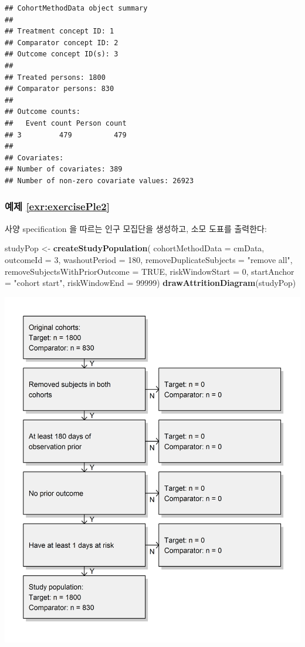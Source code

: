 \documentclass[11pt]{book}
\newenvironment{Shaded}{\begin{snugshade}}{\end{snugshade}}
\newcommand{\KeywordTok}[1]{\textcolor[rgb]{0.13,0.29,0.53}{\textbf{#1}}}
\newcommand{\DataTypeTok}[1]{\textcolor[rgb]{0.13,0.29,0.53}{#1}}
\newcommand{\DecValTok}[1]{\textcolor[rgb]{0.00,0.00,0.81}{#1}}
\newcommand{\StringTok}[1]{\textcolor[rgb]{0.31,0.60,0.02}{#1}}
\newcommand{\OtherTok}[1]{\textcolor[rgb]{0.56,0.35,0.01}{#1}}
\newcommand{\NormalTok}[1]{#1}
\theoremstyle{definition}
\theoremstyle{definition}
\theoremstyle{definition}
\theoremstyle{remark}
\begin{document}
\begin{verbatim}
## CohortMethodData object summary
## 
## Treatment concept ID: 1
## Comparator concept ID: 2
## Outcome concept ID(s): 3
## 
## Treated persons: 1800
## Comparator persons: 830
## 
## Outcome counts:
##   Event count Person count
## 3         479          479
## 
## Covariates:
## Number of covariates: 389
## Number of non-zero covariate values: 26923
\end{verbatim}

\subsubsection*{예제 \ref{exr:exercisePle2}}\label{-refexrexerciseple2}

사양 specification 을 따르는 인구 모집단을 생성하고, 소모 도표를
출력한다:

\begin{Shaded}
\begin{Highlighting}[]
\NormalTok{studyPop <-}\StringTok{ }\KeywordTok{createStudyPopulation}\NormalTok{(}
  \DataTypeTok{cohortMethodData =}\NormalTok{ cmData,}
  \DataTypeTok{outcomeId =} \DecValTok{3}\NormalTok{,}
  \DataTypeTok{washoutPeriod =} \DecValTok{180}\NormalTok{,}
  \DataTypeTok{removeDuplicateSubjects =} \StringTok{"remove all"}\NormalTok{,}
  \DataTypeTok{removeSubjectsWithPriorOutcome =} \OtherTok{TRUE}\NormalTok{,}
  \DataTypeTok{riskWindowStart =} \DecValTok{0}\NormalTok{,}
  \DataTypeTok{startAnchor =} \StringTok{"cohort start"}\NormalTok{,}
  \DataTypeTok{riskWindowEnd =} \DecValTok{99999}\NormalTok{)}
\KeywordTok{drawAttritionDiagram}\NormalTok{(studyPop)}
\end{Highlighting}
\end{Shaded}

\begin{center}\includegraphics[width=0.8\linewidth]{images/SuggestedAnswers/attrition} \end{center}
\end{document}
